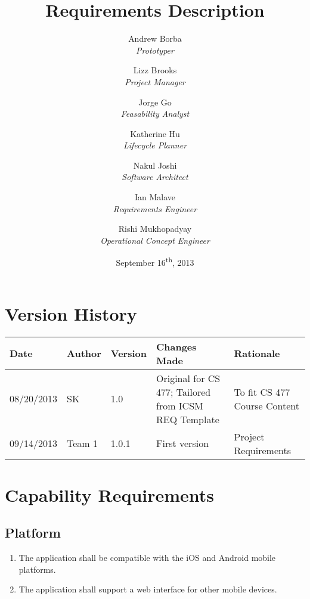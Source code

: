 \documentclass[titlepage]{article}
\title{Requirements Description}
\author{
	Andrew Borba\\ \emph{Prototyper}	\and
	 Lizz Brooks\\ \emph{Project Manager}	\and
	 Jorge Go\\ \emph{Feasability Analyst}	\and
	 Katherine Hu\\ \emph{Lifecycle Planner}	\and
	 Nakul Joshi\\ \emph{Software Architect}	\and
	 Ian Malave\\ \emph{Requirements Engineer}	\and
	 Rishi Mukhopadyay\\ \emph{Operational Concept Engineer}
}%
\date{September 16\textsuperscript{th}, 2013}
\begin{document}
\pagestyle{fancy}
\chead{}
\lfoot{}
\cfoot{\thepage}
\rfoot{}
\maketitle

\tableofcontents
\newpage
\section{Version History}
\begin{table}[h]
	\centering
    \begin{tabularx}{\textwidth}{lllXX}
    	\hline
        Date       & Author & Version & Changes Made                                         & Rationale                    \\ \hline
        08/20/2013 & SK     & 1.0     & Original for CS 477; Tailored from ICSM REQ Template & To fit CS 477 Course Content \\ 
        09/14/2013 & Team 1 & 1.0.1   & First version                                                   & Project Requirements                          \\
		\hline
    \end{tabularx}
\end{table}
\newpage
\section{Capability Requirements}

	\subsection{Platform}\begin{enumerate}
		\item The application shall be compatible with the iOS and Android mobile platforms.
		\item The application shall support a web interface for other mobile devices.
	\end{enumerate}
	
\end{document}
